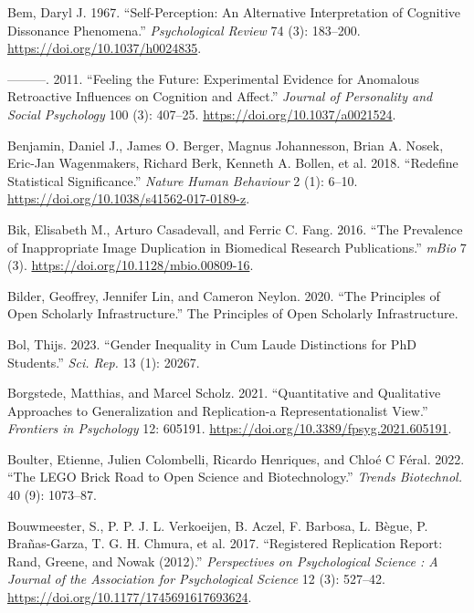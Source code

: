 \documentclass[
  letterpaper,
  DIV=11,
  numbers=noendperiod]{scrreprt}
\newlength{\cslhangindent}
\newenvironment{CSLReferences}[2] %
 {\begin{list}{}{%
  \setlength{\itemindent}{0pt}
  \setlength{\leftmargin}{0pt}
  \setlength{\parsep}{0pt}
  \ifodd #1
   \setlength{\leftmargin}{\cslhangindent}
   \setlength{\itemindent}{-1\cslhangindent}
  \fi
  \setlength{\itemsep}{#2\baselineskip}}}
 {\end{list}}
\begin{document}
\begin{CSLReferences}{1}{0}
Bem, Daryl J. 1967. {``Self-Perception: An Alternative Interpretation of
Cognitive Dissonance Phenomena.''} \emph{Psychological Review} 74 (3):
183--200. \url{https://doi.org/10.1037/h0024835}.

---------. 2011. {``Feeling the Future: Experimental Evidence for
Anomalous Retroactive Influences on Cognition and Affect.''}
\emph{Journal of Personality and Social Psychology} 100 (3): 407--25.
\url{https://doi.org/10.1037/a0021524}.

Benjamin, Daniel J., James O. Berger, Magnus Johannesson, Brian A.
Nosek, Eric-Jan Wagenmakers, Richard Berk, Kenneth A. Bollen, et al.
2018. {``Redefine Statistical Significance.''} \emph{Nature Human
Behaviour} 2 (1): 6--10.
\url{https://doi.org/10.1038/s41562-017-0189-z}.

Bik, Elisabeth M., Arturo Casadevall, and Ferric C. Fang. 2016. {``The
Prevalence of Inappropriate Image Duplication in Biomedical Research
Publications.''} \emph{mBio} 7 (3).
\url{https://doi.org/10.1128/mbio.00809-16}.

Bilder, Geoffrey, Jennifer Lin, and Cameron Neylon. 2020. {``The
Principles of Open Scholarly Infrastructure.''} The Principles of Open
Scholarly Infrastructure.

Bol, Thijs. 2023. {``Gender Inequality in Cum Laude Distinctions for
{PhD} Students.''} \emph{Sci. Rep.} 13 (1): 20267.

Borgstede, Matthias, and Marcel Scholz. 2021. {``Quantitative and
Qualitative Approaches to Generalization and Replication-a
Representationalist View.''} \emph{Frontiers in Psychology} 12: 605191.
\url{https://doi.org/10.3389/fpsyg.2021.605191}.

Boulter, Etienne, Julien Colombelli, Ricardo Henriques, and Chloé C
Féral. 2022. {``The {LEGO\textregistered{}} Brick Road to Open Science
and Biotechnology.''} \emph{Trends Biotechnol.} 40 (9): 1073--87.

Bouwmeester, S., P. P. J. L. Verkoeijen, B. Aczel, F. Barbosa, L. Bègue,
P. Brañas-Garza, T. G. H. Chmura, et al. 2017. {``Registered Replication
Report: Rand, Greene, and Nowak (2012).''} \emph{Perspectives on
Psychological Science : A Journal of the Association for Psychological
Science} 12 (3): 527--42.
\url{https://doi.org/10.1177/1745691617693624}.


\end{CSLReferences}
\end{document}
